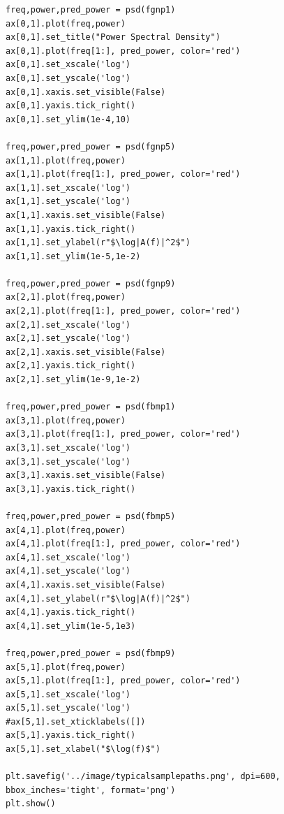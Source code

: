 \documentclass[
  sn-vancouver,
  Numbered,
  referee,
  lineno]{sn-jnl}
\begin{document}
\begin{verbatim}
freq,power,pred_power = psd(fgnp1)
ax[0,1].plot(freq,power)
ax[0,1].set_title("Power Spectral Density")
ax[0,1].plot(freq[1:], pred_power, color='red')
ax[0,1].set_xscale('log')
ax[0,1].set_yscale('log')
ax[0,1].xaxis.set_visible(False)
ax[0,1].yaxis.tick_right()
ax[0,1].set_ylim(1e-4,10)

freq,power,pred_power = psd(fgnp5)
ax[1,1].plot(freq,power)
ax[1,1].plot(freq[1:], pred_power, color='red')
ax[1,1].set_xscale('log')
ax[1,1].set_yscale('log')
ax[1,1].xaxis.set_visible(False)
ax[1,1].yaxis.tick_right()
ax[1,1].set_ylabel(r"$\log|A(f)|^2$")
ax[1,1].set_ylim(1e-5,1e-2)

freq,power,pred_power = psd(fgnp9)
ax[2,1].plot(freq,power)
ax[2,1].plot(freq[1:], pred_power, color='red')
ax[2,1].set_xscale('log')
ax[2,1].set_yscale('log')
ax[2,1].xaxis.set_visible(False)
ax[2,1].yaxis.tick_right()
ax[2,1].set_ylim(1e-9,1e-2)

freq,power,pred_power = psd(fbmp1)
ax[3,1].plot(freq,power)
ax[3,1].plot(freq[1:], pred_power, color='red')
ax[3,1].set_xscale('log')
ax[3,1].set_yscale('log')
ax[3,1].xaxis.set_visible(False)
ax[3,1].yaxis.tick_right()

freq,power,pred_power = psd(fbmp5)
ax[4,1].plot(freq,power)
ax[4,1].plot(freq[1:], pred_power, color='red')
ax[4,1].set_xscale('log')
ax[4,1].set_yscale('log')
ax[4,1].xaxis.set_visible(False)
ax[4,1].set_ylabel(r"$\log|A(f)|^2$")
ax[4,1].yaxis.tick_right()
ax[4,1].set_ylim(1e-5,1e3)

freq,power,pred_power = psd(fbmp9)
ax[5,1].plot(freq,power)
ax[5,1].plot(freq[1:], pred_power, color='red')
ax[5,1].set_xscale('log')
ax[5,1].set_yscale('log')
#ax[5,1].set_xticklabels([])
ax[5,1].yaxis.tick_right()
ax[5,1].set_xlabel("$\log(f)$")

plt.savefig('../image/typicalsamplepaths.png', dpi=600, bbox_inches='tight', format='png')
plt.show()
\end{verbatim}
\end{document}
